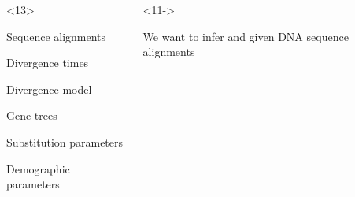 \begin{frame}
\begin{columns}[c]
        \begin{onlyenv}<13>
            \begin{minipage}[c][0.5\textheight][c]{\linewidth}
                \begin{mydescription}
                    \item[\alignmentVector] Sequence alignments
                    \item[\divTimeMapVector] Divergence times
                    \item[\divModel{}] Divergence model
                    \item[\allParameters{}] Gene trees
                    \item[\ ] Substitution parameters
                    \item[\ ] Demographic parameters
                \end{mydescription}
            \end{minipage}
        \end{onlyenv}
        \begin{uncoverenv}<11->
            \begin{minipage}[c][0.18\textheight][c]{\linewidth}
            \begin{flushleft}
                \small We want to infer \textcolor{blue}{\divModel{}} and
                \textcolor{blue}{\divTimeMapVector} given DNA sequence
                alignments
                \textcolor{blue}{\alignmentVector}
            \end{flushleft}
            \end{minipage}

\end{uncoverenv}
\end{columns}
\end{frame}
